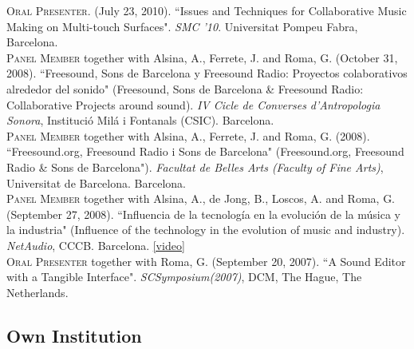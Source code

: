 \documentclass[10pt, a4paper]{article}
\newcommand{\years}[1]{\marginnote{\scriptsize #1}}
\begin{document}
\years{2010} \textsc{Oral Presenter}. (July 23, 2010). “Issues and Techniques for Collaborative Music Making on Multi-touch Surfaces". \emph{SMC '10}. Universitat Pompeu Fabra, Barcelona.\\
\years{2008c} \textsc{Panel Member} together with Alsina, A., Ferrete, J. and Roma, G. (October 31, 2008). “Freesound, Sons de Barcelona y Freesound Radio: Proyectos colaborativos alrededor del sonido" (Freesound, Sons de Barcelona \& Freesound Radio: Collaborative Projects around sound). \emph{IV Cicle de Converses d'Antropologia Sonora}, Institució Milá i Fontanals (CSIC). Barcelona.\\
\years{2008b} \textsc{Panel Member} together with Alsina, A., Ferrete, J. and Roma, G. (2008). “Freesound.org, Freesound Radio i Sons de Barcelona" (Freesound.org, Freesound Radio \& Sons de Barcelona"). \emph{Facultat de Belles Arts (Faculty of Fine Arts)}, Universitat de Barcelona. Barcelona.\\
\years{2008a} \textsc{Panel Member} together with Alsina, A., de Jong, B., Loscos, A. and Roma, G. (September 27, 2008). “Influencia de la tecnología en la evolución de la música y la industria" (Influence of the technology in the evolution of music and industry). \emph{NetAudio}, CCCB. Barcelona. \href{https://www.youtube.com/watch?v=6JlCCvYXrHY}{[video]}\\
\years{2007}\textsc{Oral Presenter} together with Roma, G. (September 20, 2007). “A Sound Editor with a Tangible Interface". \emph{SCSymposium(2007)}, DCM, The Hague, The Netherlands.

\subsection*{Own Institution}
\noindent
\end{document}
